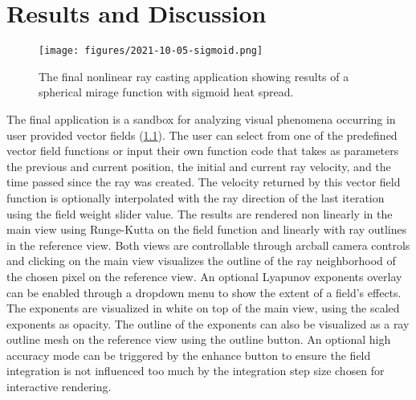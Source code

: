 \chapter{Results and Discussion}

\begin{figure}[!t]
  \centering
  \texttt{[image: figures/2021-10-05-sigmoid.png]}
  \caption{The final nonlinear ray casting application showing results of a spherical mirage function with sigmoid heat spread.}
  \label{fig:final application}
\end{figure}

The final application is a sandbox for analyzing visual phenomena occurring in user provided vector fields (\cref{fig:final application}).
The user can select from one of the predefined vector field functions or input their own function code that takes as parameters the previous and current position, the initial and current ray velocity, and the time passed since the ray was created.
The velocity returned by this vector field function is optionally interpolated with the ray direction of the last iteration using the field weight slider value.
The results are rendered non linearly in the main view using Runge-Kutta on the field function and linearly with ray outlines in the reference view.
Both views are controllable through arcball camera controls and clicking on the main view visualizes the outline of the ray neighborhood of the chosen pixel on the reference view.
An optional Lyapunov exponents overlay can be enabled through a dropdown menu to show the extent of a field's effects.
The exponents are visualized in white on top of the main view, using the scaled exponents as opacity.
The outline of the exponents can also be visualized as a ray outline mesh on the reference view using the outline button.
An optional high accuracy mode can be triggered by the enhance button to ensure the field integration is not influenced too much by the integration step size chosen for interactive rendering.

